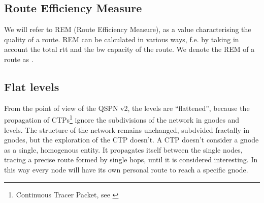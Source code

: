 \documentclass[a4paper]{article}
\begin{document}
\subsection{Route Efficiency Measure}
We will refer to REM (Route Efficiency Measure), as a value characterising the
quality of a route. REM can be calculated in various ways, f.e. by taking in
account the total rtt and the bw capacity of the route.  We denote the REM of
a route  as .


\subsection{Flat levels}
\label{sec:flat}
From the point of view of the QSPN v2, the levels are ``flattened'', because
the propagation of CTPs\footnote{Continuous Tracer Packet, see \cite{qspndoc}} ignore the subdivisions of
the network in gnodes and levels. The structure of the network remains
unchanged, subdvided fractally in gnodes, but the exploration of the CTP
doesn't. A CTP doesn't consider a gnode as a single, homogenous entity. It propagates 
itself between the single nodes, tracing a precise route formed by single
hops, until it is considered interesting. 
In this way every node will have its own personal route to reach a specific gnode. 
\end{document}
